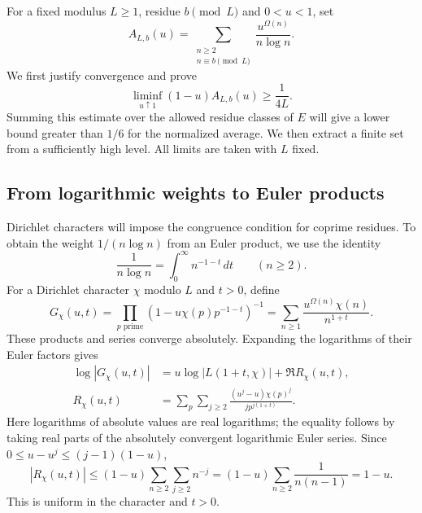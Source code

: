 \documentclass[11pt,reqno]{amsart}
\theoremstyle{definition}
\theoremstyle{remark}
\numberwithin{equation}{section}
\newcommand{\Om}{\Omega}
\begin{document}
For a fixed modulus $L\geq1$, residue $b\pmod L$ and $0<u<1$, set
\[
 A_{L,b}(u)=\sum_{\substack{n\geq2\\n\equiv b\pmod L}}
       \frac{u^{\Om(n)}}{n\log n}.
\]
We first justify convergence and prove
\begin{equation}\label{eq:residue-abel}
 \liminf_{u\uparrow1}(1-u)A_{L,b}(u)\geq\frac1{4L}.
\end{equation}
Summing this estimate over the allowed residue classes of $E$ will
give a lower bound greater than $1/6$ for the normalized average.
We then extract a finite set from a sufficiently high level.
All limits are taken with $L$ fixed.

\subsection{From logarithmic weights to Euler products}
Dirichlet characters will impose the congruence condition for coprime
residues. To obtain the weight $1/(n\log n)$ from an Euler product, we
use the identity
\[
 \frac1{n\log n}=\int_0^\infty n^{-1-t}\,dt\qquad(n\geq2).
\]
For a Dirichlet character $\chi$ modulo $L$ and $t>0$, define
\[
 G_\chi(u,t)=\prod_{p\text{ prime}}(1-u\chi(p)p^{-1-t})^{-1}
       =\sum_{n\geq1}\frac{u^{\Om(n)}\chi(n)}{n^{1+t}}.
\]
These products and series converge absolutely. Expanding the logarithms
of their Euler factors gives
\begin{equation}\label{eq:log-product}
 \begin{aligned}
 \log|G_\chi(u,t)|&=u\log|L(1+t,\chi)|+\Re R_\chi(u,t),\\
 R_\chi(u,t)&=\sum_p\sum_{j\geq2}
       \frac{(u^j-u)\chi(p)^j}{j p^{j(1+t)}}.
 \end{aligned}
\end{equation}
Here logarithms of absolute values are real logarithms; the equality
follows by taking real parts of the absolutely convergent logarithmic
Euler series. Since $0\leq u-u^j\leq(j-1)(1-u)$,
\begin{equation}\label{eq:log-remainder}
 |R_\chi(u,t)|\leq(1-u)\sum_{n\geq2}\sum_{j\geq2}n^{-j}
   =(1-u)\sum_{n\geq2}\frac1{n(n-1)}=1-u.
\end{equation}
This is uniform in the character and $t>0$.
\end{document}

